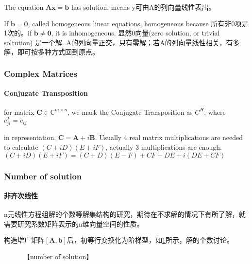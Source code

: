 \documentclass[UTF8]{../../09-Mathematics}
\begin{document}
The equation $\boldsymbol A \boldsymbol x = \boldsymbol b$ has solution, means y可由A的列向量线性表出。

If $\boldsymbol b = \boldsymbol 0$, called homogeneous linear equations, homogeneous because 所有非0项是1次的。if $\boldsymbol b \neq \boldsymbol 0$, it is inhomogeneous. 显然0向量(zero solution, or trivial soltution) 是一个解. A的列向量正交，只有零解；若A的列向量线性相关，有多解，即可按多种方式回到原点。



\subsubsection{Complex Matrices}

\paragraph{Conjugate Transposition}

for matrix $ \boldsymbol  C \in \mathbb{C}^{m \times n}$, we mark the Conjugate Transposition as $C^H$,
where $c^T_{ji} = \overline{c}_{ij}$

in representation, $ \boldsymbol  C = \boldsymbol A + i \boldsymbol B$. Usually 4 real matrix multiplications are needed to calculate $(C+iD)(E+ i F)$, actually 3  multiplications  are enough. $(C+iD)(E+ i F) =  (C+D)(E-F)+CF-DE + i(DE+CF)$




\subsubsection{Number of solution}

\paragraph{非齐次线性}

n元线性方程组解的个数等解集结构的研究，期待在不求解的情况下有所了解，就需要研究系数矩阵表示的n维向量空间的性质。

构造增广矩阵$[\boldsymbol A,\boldsymbol b ]$后，初等行变换化为阶梯型，如\ref{fig:number_of_solution}所示，解的个数讨论。

\begin{figure}[h]
  \centering
  \caption{【number of solution】}\label{fig:number_of_solution}
\end{figure}
\end{document}
